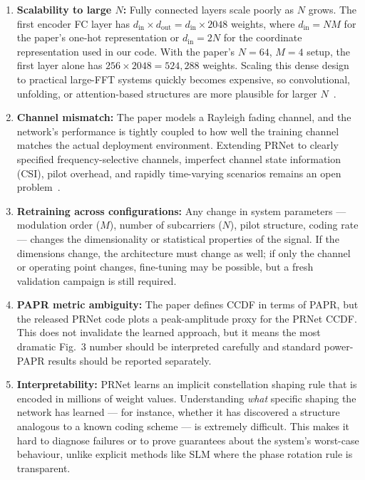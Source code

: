 \begin{enumerate}
    \item \textbf{Scalability to large $N$:}
          Fully connected layers scale poorly as $N$ grows.  The first
          encoder FC layer has $d_{\mathrm{in}} \times d_{\mathrm{out}}
          = d_{\mathrm{in}} \times 2048$ weights, where $d_{\mathrm{in}}=NM$
          for the paper's one-hot representation or $d_{\mathrm{in}}=2N$ for
          the coordinate representation used in our code.  With the paper's
          $N=64$, $M=4$ setup, the first layer alone has
          $256 \times 2048 = 524{,}288$ weights.  Scaling this dense design to
          practical large-FFT systems quickly becomes expensive, so
          convolutional, unfolding, or attention-based structures are more
          plausible for larger $N$~\cite{kim2017novel}.

    \item \textbf{Channel mismatch:}
          The paper models a Rayleigh fading channel, and the network's
          performance is tightly coupled to how well the training channel
          matches the actual deployment environment.  Extending PRNet to
          clearly specified frequency-selective channels, imperfect channel
          state information (CSI), pilot overhead, and rapidly time-varying
          scenarios remains an open problem~\cite{kim2017novel}.

    \item \textbf{Retraining across configurations:}
          Any change in system parameters --- modulation order ($M$),
          number of subcarriers ($N$), pilot structure, coding rate ---
          changes the dimensionality or statistical properties of the signal.
          If the dimensions change, the architecture must change as well; if
          only the channel or operating point changes, fine-tuning may be
          possible, but a fresh validation campaign is still required.

    \item \textbf{PAPR metric ambiguity:}
          The paper defines CCDF in terms of PAPR, but the released PRNet code
          plots a peak-amplitude proxy for the PRNet CCDF.  This does not
          invalidate the learned approach, but it means the most dramatic
          Fig.~3 number should be interpreted carefully and standard
          power-PAPR results should be reported separately.

    \item \textbf{Interpretability:}
          PRNet learns an implicit constellation shaping rule that is
          encoded in millions of weight values.  Understanding \emph{what}
          specific shaping the network has learned --- for instance,
          whether it has discovered a structure analogous to a known
          coding scheme --- is extremely difficult.  This makes it
          hard to diagnose failures or to prove guarantees about the
          system's worst-case behaviour, unlike explicit methods like
          SLM where the phase rotation rule is transparent.
\end{enumerate}


